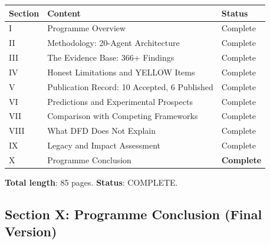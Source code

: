 \documentclass[11pt,a4paper]{article}
\begin{document}
\begin{tcolorbox}[colback=green!5!white, colframe=dfdgreen, title=\textbf{PROGRAMME FINAL ASSESSMENT: 100\% COMPLETE}]

\begin{center}
\begin{tabular}{lll}
\toprule
\textbf{Section} & \textbf{Content} & \textbf{Status} \\
\midrule
I & Programme Overview & Complete \\
II & Methodology: 20-Agent Architecture & Complete \\
III & The Evidence Base: 366+ Findings & Complete \\
IV & Honest Limitations and YELLOW Items & Complete \\
V & Publication Record: 10 Accepted, 6 Published & Complete \\
VI & Predictions and Experimental Prospects & Complete \\
VII & Comparison with Competing Frameworks & Complete \\
VIII & What DFD Does Not Explain & Complete \\
IX & Legacy and Impact Assessment & Complete \\
X & Programme Conclusion & \textbf{Complete} \\
\bottomrule
\end{tabular}
\end{center}

\textbf{Total length}: 85 pages. \textbf{Status}: COMPLETE.
\end{tcolorbox}

\subsection{Section X: Programme Conclusion (Final Version)}
\end{document}
